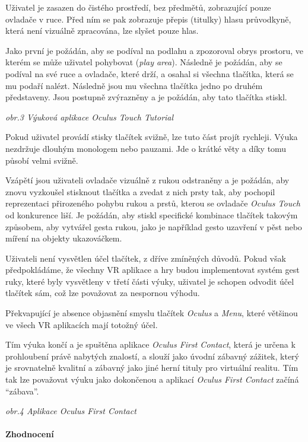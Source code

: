 Uživatel je zasazen do čistého prostředí, bez předmětů, zobrazující
pouze ovladače v ruce. Před ním se pak zobrazuje přepis (titulky) hlasu
průvodkyně, která není vizuálně zpracována, lze slyšet pouze hlas.

Jako první je požádán, aby se podíval na podlahu a zpozoroval obrys
prostoru, ve kterém se může uživatel pohybovat (\emph{play area}).
Následně je požádán, aby se podíval na své ruce a ovladače, které drží,
a osahal si všechna tlačítka, která se mu podaří nalézt. Následně jsou
mu všechna tlačítka jedno po druhém představeny. Jsou postupně
zvýrazněny a je požádán, aby tato tlačítka stiskl.


\emph{obr.3 Výuková aplikace Oculus Touch Tutorial}

Pokud uživatel provádí stisky tlačítek svižně, lze tuto část projít
rychleji. Výuka nezdržuje dlouhým monologem nebo pauzami. Jde o krátké
věty a díky tomu působí velmi svižně.

Vzápětí jsou uživateli ovladače vizuálně z rukou odstraněny a je
požádán, aby znovu vyzkoušel stisknout tlačítka a zvedat z nich prsty
tak, aby pochopil reprezentaci přirozeného pohybu rukou a prstů, kterou
se ovladače \emph{Oculus Touch} od konkurence liší. Je požádán, aby
stiskl specifické kombinace tlačítek takovým způsobem, aby vytvářel
gesta rukou, jako je například gesto uzavření v pěst nebo míření na
objekty ukazováčkem.

Uživateli není vysvětlen účel tlačítek, z dříve zmíněných důvodů. Pokud
však předpokládáme, že všechny VR aplikace a hry budou implementovat
systém gest ruky, které byly vysvětleny v třetí části výuky, uživatel je
schopen odvodit účel tlačítek sám, což lze považovat za nespornou
výhodu.

Překvapující je absence objasnění smyslu tlačítek \emph{Oculus} a
\emph{Menu}, které většinou ve všech VR aplikacích mají totožný účel.

Tím výuka končí a je spuštěna aplikace \emph{Oculus First Contact},
která je určena k prohloubení právě nabytých znalostí, a slouží jako
úvodní zábavný zážitek, který je srovnatelně kvalitní a zábavný jako
jiné herní tituly pro virtuální realitu. Tím tak lze považovat výuku
jako dokončenou a aplikací \emph{Oculus First Contact} začíná
``zábava''.


\emph{obr.4 Aplikace Oculus First Contact}

\paragraph{Zhodnocení}\label{zhodnocenuxed-1}

